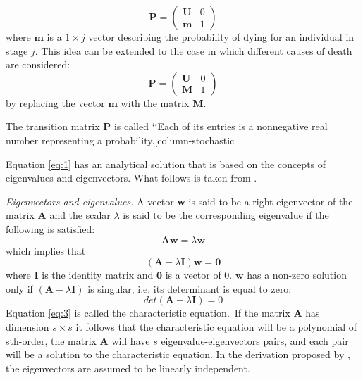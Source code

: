\documentclass[\main/main.tex]{subfiles}
\begin{document}
\begin{equation}
    \mathbf{P} = \begin{pmatrix}
        \mathbf{U} &  0\\
    \mathbf{m}& 1
    \end{pmatrix}
\end{equation}
where $\mathbf{m}$ is a  $1 \times j$ vector describing the probability of dying for an individual in stage $j$.
This idea can be extended to the case in which different causes of death are considered:
\begin{equation}
    \mathbf{P} = \begin{pmatrix}
        \mathbf{U} &  0\\
    \mathbf{M}& 1
    \end{pmatrix}
\end{equation}
by replacing the vector $\mathbf{m}$ with the matrix $\mathbf{M}$.

The transition matrix $\mathbf{P}$ is called \lq\lq Each of its entries is a nonnegative real number representing a probability.[column-stochastic

Equation \ref{eq:1} has an analytical solution that is based on the concepts of eigenvalues and eigenvectors. What follows is taken from \cite{Keyfitz2005}.

\noindent \textit{Eigenvectors and eigenvalues.} A vector \textbf{w} is said to be a right eigenvector of the matrix \textbf{A} and the scalar $\lambda$ is said to be the corresponding eigenvalue if the following is satisfied:
\begin{equation} \label{eq:2}
    \mathbf{Aw} = \lambda \mathbf{w}
\end{equation}
which implies that
\begin{equation} \label{eq:2}
    (\mathbf{A} - \lambda \mathbf{I}) \mathbf{w} =\mathbf{0} 
\end{equation}
where $\mathbf{I}$ is the identity matrix and $\mathbf{0} $ is a vector of 0. 
$\mathbf{w}$ has a non-zero solution only if $(\mathbf{A} - \lambda \mathbf{I})$ is singular, i.e. its determinant is equal to zero:
\begin{equation}\label{eq:3}
    det (\mathbf{A} - \lambda \mathbf{I}) = 0
\end{equation}
Equation \ref{eq:3} is called the characteristic equation.\
If the matrix $\mathbf{A}$ has dimension $s \times s$ it follows that the characteristic equation will be a polynomial of sth-order, the matrix $\mathbf{A}$ will have $s$ eigenvalue-eigenvectors pairs, and each pair will be a solution to the characteristic equation. In the derivation proposed by \cite{Keyfitz2005}, the eigenvectors are assumed to be linearly independent.
\end{document}
